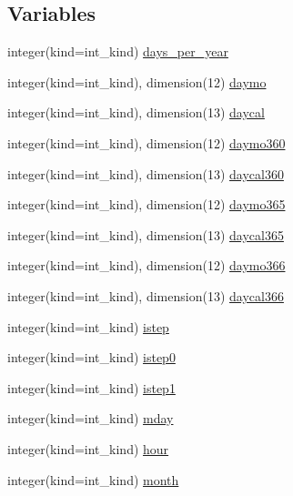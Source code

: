 \subsection*{Variables}
\begin{DoxyCompactItemize}
\item 
integer(kind=int\_\-kind) \hyperlink{namespaceice__calendar_a1fa9382761e78de77e0109c55630554b}{days\_\-per\_\-year}
\item 
integer(kind=int\_\-kind), dimension(12) \hyperlink{namespaceice__calendar_a1d4afbbddfef91146892cd47f6734b77}{daymo}
\item 
integer(kind=int\_\-kind), dimension(13) \hyperlink{namespaceice__calendar_ab55e85b8212a213de225f16289d5bb75}{daycal}
\item 
integer(kind=int\_\-kind), dimension(12) \hyperlink{namespaceice__calendar_aa23a9d5a11d0cd15e84d3b9771338ad5}{daymo360}
\item 
integer(kind=int\_\-kind), dimension(13) \hyperlink{namespaceice__calendar_ad91c534442e93775fa9630bdaa9da806}{daycal360}
\item 
integer(kind=int\_\-kind), dimension(12) \hyperlink{namespaceice__calendar_abd42cdcd4849fa25afe07f9e672c677e}{daymo365}
\item 
integer(kind=int\_\-kind), dimension(13) \hyperlink{namespaceice__calendar_a080909b268176fb29d513a184cc30386}{daycal365}
\item 
integer(kind=int\_\-kind), dimension(12) \hyperlink{namespaceice__calendar_a5db58762f256066e2e55974bc51b0b1e}{daymo366}
\item 
integer(kind=int\_\-kind), dimension(13) \hyperlink{namespaceice__calendar_a19cae1dafbfb758fdfe8ee3378a033ef}{daycal366}
\item 
integer(kind=int\_\-kind) \hyperlink{namespaceice__calendar_a6899d76938ada3889a62308eb41331bf}{istep}
\item 
integer(kind=int\_\-kind) \hyperlink{namespaceice__calendar_a225919cc1367b6648a33740b98427512}{istep0}
\item 
integer(kind=int\_\-kind) \hyperlink{namespaceice__calendar_a56f19d1b69c0acd3d8fd3a6f06855e48}{istep1}
\item 
integer(kind=int\_\-kind) \hyperlink{namespaceice__calendar_af65b8e64abed62d107827ade781bb968}{mday}
\item 
integer(kind=int\_\-kind) \hyperlink{namespaceice__calendar_a0d6f497f4cdeb0413e2c5eadca76d8a1}{hour}
\item 
integer(kind=int\_\-kind) \hyperlink{namespaceice__calendar_a97f8410cf5a5f94b8c2a271c080c4bd7}{month}

\end{DoxyCompactItemize}
